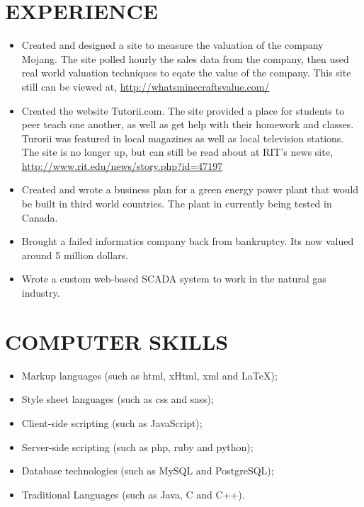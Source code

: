 \documentclass[10pt]{article}
\newcommand{%
	\thumbnail}[2]{
		\raggedleft\hfill{\href{#1}
			{\trick \raisebox{-3pt}{.}
				\fbox{
			\texttt{[image: \#2]}}
			\raisebox{70pt}{.}}}
			}
\begin{document}
\begin{minipage}[t]{0.8\textwidth}
\section{EXPERIENCE}
\vspace{0pt}
\begin{itemize}[leftmargin=1cm, itemsep=0pt, topsep=5pt] \Text\raggedright
	\item Created and designed a site to measure the valuation of the company Mojang. The site polled hourly the sales data from the company, then used real world valuation techniques to eqate the value of the company. This site still can be viewed at, \url{http://whatsminecraftsvalue.com/}

	\item Created the website Tutorii.com. The site provided a place for students to peer teach one another, as well as get help with their homework and classes. Turorii was featured in local magazines as well as local television stations. The site is no longer up, but can still be read about at RIT's news site, \url{http://www.rit.edu/news/story.php?id=47197} 

	\item Created and wrote a business plan for a green energy power plant that would be built in third world countries.  The plant in currently being tested in Canada.

  \item Brought a failed informatics company back from bankruptcy. Its now valued around 5 million dollars.

  \item Wrote a custom web-based SCADA system to work in the natural gas industry.

\end{itemize}
\vspace{10pt}
\section{COMPUTER SKILLS}
\begin{itemize}[leftmargin=1cm, itemsep=0pt, topsep=5pt]\Text
\item Markup languages (such as {\TextSC html}, {\TextSC xHtml}, {\TextSC xml} and \LaTeX);
\item Style sheet languages (such as {\TextSC css} and {\TextSC sass});
\item Client-side scripting (such as JavaScript);
\item Server-side scripting (such as {\TextSC php}, {\TextSC ruby} and {\TextSC python});
\item Database technologies (such as MySQL and PostgreSQL);
\item Traditional Languages (such as Java, C and C++).
\end{itemize}
\end{minipage} %
\end{document}
